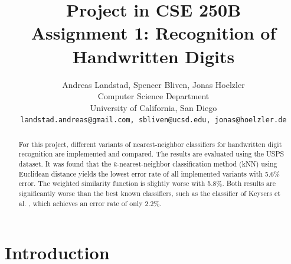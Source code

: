 \documentclass[10pt,twocolumn,letterpaper]{article}
\begin{document}
\title{
Project in CSE 250B\\
Assignment 1: Recognition of Handwritten Digits}

\author{Andreas Landstad, Spencer Bliven, Jonas Hoelzler\\
Computer Science Department\\
University of California, San Diego\\
{\tt\small landstad.andreas@gmail.com, sbliven@ucsd.edu, jonas@hoelzler.de}
}%
\maketitle
\thispagestyle{empty}

\begin{abstract}
For this project, different variants of nearest-neighbor classifiers for handwritten digit recognition are implemented and compared. The results are evaluated using the USPS dataset. It was found that the $k$-nearest-neighbor classification method (kNN) using Euclidean distance yields the lowest error rate of all implemented variants with 5.6\% error.
The weighted similarity function is slightly worse with 5.8\%.   
Both results are significantly worse than the best known classifiers, such as the classifier of Keysers et al. \cite{keysers}, which achieves an error rate of only 2.2\%.
\end{abstract}

\section{Introduction}
\end{document}

